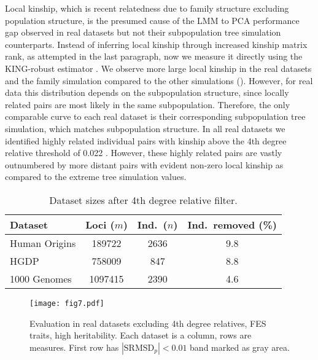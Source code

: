 \documentclass[9pt,lineno]{elife}
\newcommand{\rmsd}{\text{SRMSD}_p}
\begin{document}
Local kinship, which is recent relatedness due to family structure excluding population structure, is the presumed cause of the LMM to PCA performance gap observed in real datasets but not their subpopulation tree simulation counterparts.
Instead of inferring local kinship through increased kinship matrix rank, as attempted in the last paragraph, now we measure it directly using the KING-robust estimator \citep{manichaikul_robust_2010}.
We observe more large local kinship in the real datasets and the family simulation compared to the other simulations ().
However, for real data this distribution depends on the subpopulation structure, since locally related pairs are most likely in the same subpopulation.
Therefore, the only comparable curve to each real dataset is their corresponding subpopulation tree simulation, which matches subpopulation structure.
In all real datasets we identified highly related individual pairs with kinship above the 4th degree relative threshold of 0.022 \citep{manichaikul_robust_2010, conomos_model-free_2016}.
However, these highly related pairs are vastly outnumbered by more distant pairs with evident non-zero local kinship as compared to the extreme tree simulation values.

\begin{table}[bt]
  \caption{Dataset sizes after 4th degree relative filter.}
  \label{tab:king_cutoff}
  \begin{tabular}{lSSS}
    \toprule
    Dataset & {Loci ($m$)} & {Ind.~($n$)} & {Ind.~removed (\%)} \\
    \midrule
    Human Origins	&189722		&2636	&9.8 \\
    HGDP		&758009		&847	&8.8 \\
    1000 Genomes	&1097415	&2390	&4.6 \\
    \bottomrule
  \end{tabular}
\end{table}

\begin{figure}
  \texttt{[image: fig7.pdf]}
  \caption{
    Evaluation in real datasets excluding 4th degree relatives, FES traits, high heritability.
    Each dataset is a column, rows are measures.
    First row has $|\rmsd| < 0.01$ band marked as gray area.
  }
  \label{fig:king_cutoff}
  \label{figsupp:king_cutoff-h3}
\end{figure}
\end{document}

